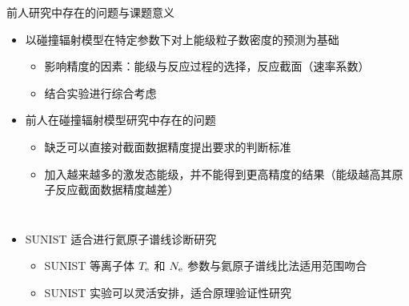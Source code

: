 \begin{frame}{前人研究中存在的问题与课题意义}
	\begin{itemize}
		\item 以碰撞辐射模型在特定参数下对上能级粒子数密度的预测为基础
			\begin{itemize}
				\item 影响精度的因素：能级与反应过程的选择，反应截面（速率系数）
				\item 结合实验进行综合考虑%
			\end{itemize}
		\item 前人在碰撞辐射模型研究中存在的问题
			\begin{itemize}
				\item 缺乏可以直接对截面数据精度提出要求的判断标准%
				\item 加入越来越多的激发态能级，并不能得到更高精度的结果（能级越高其原子反应截面数据精度越差）
			\end{itemize}
	\end{itemize}
	\vspace{-1.2em}
	\pause
	\begin{columns}
	\begin{itemize}
		\item SUNIST 适合进行氦原子谱线诊断研究
			\begin{itemize}
				\item SUNIST 等离子体 $T_{\rm e}$ 和 $N_{\rm e}$ 参数与氦原子谱线比法适用范围吻合
				\item SUNIST 实验可以灵活安排，适合原理验证性研究
			\end{itemize}
	\end{itemize}
\end{columns}
\end{frame}
